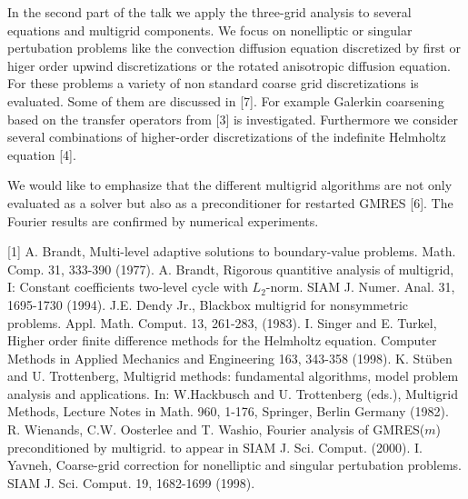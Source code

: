 \documentclass[11pt]{article}
\begin{document}
In the second part of the talk we apply the three-grid analysis to several
equations and multigrid components. We focus on nonelliptic or singular 
pertubation problems like the convection diffusion equation discretized by
first or higer order upwind discretizations or the rotated anisotropic
diffusion equation. For these problems a variety of non standard coarse
grid discretizations is evaluated. Some of them are discussed in [7].
For example Galerkin coarsening based on the transfer operators from [3] is
investigated. Furthermore we consider several combinations of higher-order
discretizations of the indefinite Helmholtz equation [4]. 

We would like to emphasize that the different multigrid algorithms are not
only evaluated as a solver but also as a preconditioner for restarted GMRES
[6].
The Fourier results are confirmed by numerical experiments.


[1] A. Brandt, Multi-level adaptive solutions to boundary-value problems.
    Math. Comp. 31, 333-390 (1977).
 \newline 
[2] A. Brandt, Rigorous quantitive analysis of multigrid, I:
    Constant coefficients two-level cycle with $L_2$-norm. 
    SIAM J. Numer. Anal. 31, 1695-1730 (1994).
 \newline 
[3] J.E. Dendy Jr., Blackbox multigrid for nonsymmetric problems.
    Appl. Math. Comput. 13, 261-283, (1983).
 \newline 
[4] I. Singer and E. Turkel, Higher order finite difference methods for the
    Helmholtz equation. Computer Methods in Applied Mechanics and Engineering
    163, 343-358 (1998).
 \newline 
[5] K. St\"uben and U. Trottenberg, Multigrid methods: fundamental algorithms,
    model problem analysis and applications. 
    In: W.Hackbusch and U. Trottenberg (eds.), Multigrid Methods,
    Lecture Notes in Math. 960, 1-176, Springer, Berlin Germany (1982).
 \newline 
[6] R. Wienands, C.W. Oosterlee and T. Washio,
    Fourier analysis of GMRES($m$) preconditioned by multigrid. 
    to appear in SIAM J. Sci. Comput. (2000).
 \newline 
[7] I. Yavneh, Coarse-grid correction for nonelliptic and singular
    pertubation problems. SIAM J. Sci. Comput. 19, 1682-1699 (1998).
\end{document}
